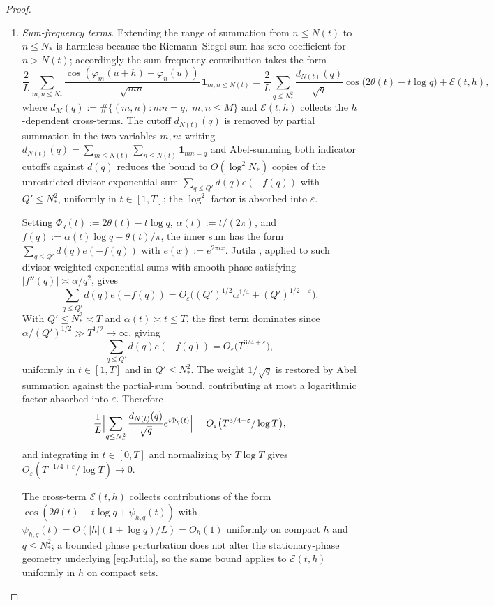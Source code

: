 \documentclass[12pt]{amsart}
\theoremstyle{remark}
\begin{document}
\begin{proof}
\begin{enumerate}
\item\label{item:sumfreq}
\emph{Sum-frequency terms}.  Extending the range of summation from
$n\leq N(t)$ to $n\leq N_*$ is harmless because the Riemann--Siegel
sum has zero coefficient for $n>N(t)$; accordingly the sum-frequency
contribution takes the form
\[
  \frac{2}{L}\sum_{m,n\leq N_*}
  \frac{\cos(\varphi_m(u+h)+\varphi_n(u))}{\sqrt{mn}}\,
  \mathbf{1}_{m,n\leq N(t)}
  = \frac{2}{L}\sum_{q\leq N_*^2}\frac{d_{N(t)}(q)}{\sqrt{q}}
    \cos\bigl(2\theta(t)-t\log q\bigr) + \mathcal{E}(t,h),
\]
where $d_M(q):=\#\{(m,n):mn=q,\;m,n\leq M\}$ and $\mathcal{E}(t,h)$
collects the $h$-dependent cross-terms.  The cutoff $d_{N(t)}(q)$ is
removed by partial summation in the two variables $m,n$: writing
$d_{N(t)}(q)=\sum_{m\leq N(t)}\sum_{n\leq N(t)}\mathbf{1}_{mn=q}$ and
Abel-summing both indicator cutoffs against $d(q)$ reduces the bound
to $O(\log^2 N_*)$ copies of the unrestricted divisor-exponential sum
$\sum_{q\leq Q'}d(q)e(-f(q))$ with $Q'\leq N_*^2$, uniformly in
$t\in[1,T]$; the $\log^2$ factor is absorbed into $\varepsilon$.

Setting $\Phi_q(t):=2\theta(t)-t\log q$, $\alpha(t):=t/(2\pi)$, and
$f(q):=\alpha(t)\log q-\theta(t)/\pi$, the inner sum has the form
$\sum_{q\leq Q'}d(q)e(-f(q))$ with $e(x):=e^{2\pi ix}$.
Jutila \cite[Thm.~1]{Jutila}, applied to such divisor-weighted
exponential sums with smooth phase satisfying $|f''(q)|\asymp\alpha/q^2$,
gives
\begin{equation}\label{eq:Jutila}
  \sum_{q\leq Q'}d(q)e(-f(q))
  = O_\varepsilon\bigl((Q')^{1/2}\alpha^{1/4}+(Q')^{1/2+\varepsilon}\bigr).
\end{equation}
With $Q'\leq N_*^2\asymp T$ and $\alpha(t)\asymp t\leq T$, the first
term dominates since $\alpha/(Q')^{1/2}\gg T^{1/2}\to\infty$, giving
\[
  \sum_{q\leq Q'}d(q)e(-f(q))=O_\varepsilon\bigl(T^{3/4+\varepsilon}\bigr),
\]
uniformly in $t\in[1,T]$ and in $Q'\leq N_*^2$.  The weight
$1/\sqrt{q}$ is restored by Abel summation against the partial-sum
bound, contributing at most a logarithmic factor absorbed into
$\varepsilon$.  Therefore
\[
  \frac{1}{L}\Bigl|\sum_{q\leq N_*^2}\frac{d_{N(t)}(q)}{\sqrt{q}}
  e^{i\Phi_q(t)}\Bigr|
  = O_\varepsilon\bigl(T^{3/4+\varepsilon}/\log T\bigr),
\]
and integrating in $t\in[0,T]$ and normalizing by $T\log T$ gives
$O_\varepsilon(T^{-1/4+\varepsilon}/\log T)\to 0$.

The cross-term $\mathcal{E}(t,h)$ collects contributions of the form
$\cos(2\theta(t)-t\log q+\psi_{h,q}(t))$ with
$\psi_{h,q}(t)=O(|h|(1+\log q)/L)=O_h(1)$ uniformly on compact $h$ and
$q\leq N_*^2$; a bounded phase perturbation does not alter the
stationary-phase geometry underlying \eqref{eq:Jutila}, so the same
bound applies to $\mathcal{E}(t,h)$ uniformly in $h$ on compact sets.


\end{enumerate}
\end{proof}
\end{document}
